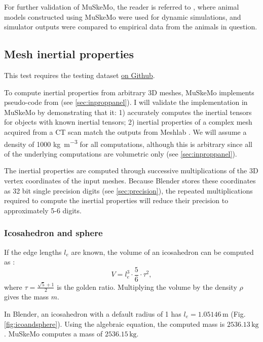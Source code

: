\documentclass{article}
\begin{document}
For further validation of MuSkeMo, the reader is referred to \cite{vanbijlertMusclecontrolledPhysicsSimulations2024,vanbijlertMuscleDrivenPredictivePhysics2024}, where animal models constructed using MuSkeMo were used for dynamic simulations, and simulator outputs were compared to empirical data from the animals in question.


\subsection{Mesh inertial properties}
\label{sec:inpropvalidation}


This test requires the testing dataset \href{https://github.com/PashavanBijlert/MuSkeMo/releases/tag/v0.x}{on Github}.

To compute inertial properties from arbitrary 3D meshes, MuSkeMo implements pseudo-code from \cite{eberlyGamePhysics2004} (see \ref{sec:inproppanel}). I will validate the implementation in MuSkeMo by demonstrating that it: 1) accurately computes the inertial tensors for objects with known inertial tensors; 2) inertial properties of a complex mesh acquired from a CT scan match the outputs from Meshlab \cite{cignoniMeshLabOpenSourceMesh2008}. We will assume a density of 1000 \si{kg m^{-3}} for all computations, although this is arbitrary since all of the underlying computations are volumetric only (see \ref{sec:inproppanel}).

The inertial properties are computed through successive multiplications of the 3D vertex coordinates of the input meshes. Because Blender stores these coordinates as 32 bit single precision digits (see \ref{sec:precision}), the repeated multiplications required to compute the inertial properties will reduce their precision to approximately 5-6 digits.

\subsubsection*{Icosahedron and sphere}

If the edge lengths \(l_{e}\) are known, the volume of an icosahedron can be computed as \cite{satterlyMomentsInertiaPolyhedra1958}:
\begin{equation}
V = l_{e}^3 \cdot \frac{5}{6} \cdot \tau^2,
\end{equation}
where \(\tau = \frac{\sqrt{5} + 1}{2}\) is the golden ratio. Multiplying the volume by the density \(\rho\) gives the mass \(m\).

In Blender, an icosahedron with a default radius of 1 has \(l_{e} = 1.05146 \, \si{\metre}\) (Fig. \ref{fig:icoandsphere}). Using the algebraic equation, the computed mass is \(2536.13 \, \si{\kilogram}\). MuSkeMo computes a mass of \(2536.15 \, \si{\kilogram}\). 
\end{document}
